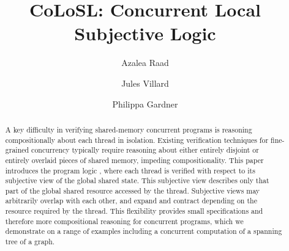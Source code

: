 \documentclass[runningheads,a4paper]{llncs}
\begin{document}
%
\title{CoLoSL: Concurrent Local Subjective Logic}
\author{Azalea Raad\and Jules Villard\and Philippa Gardner}

\maketitle

\begin{abstract}
A key difficulty in verifying shared-memory concurrent programs is
reasoning compositionally about each thread in isolation. Existing
verification techniques for fine-grained concurrency typically require
reasoning about either entirely disjoint or entirely overlaid pieces
of shared memory, impeding compositionality.  This paper introduces
the program logic \colosl, where each thread is verified with respect
to its subjective view of the global shared state.  This subjective
view describes only that part of the global shared resource accessed
by the thread. Subjective views may arbitrarily overlap with each
other, and expand and contract depending on the resource required by
the thread.  This flexibility provides small specifications and
therefore more compositional reasoning for concurrent programs, which
we demonstrate on a range of examples including a concurrent
computation of a spanning tree of a graph.
\end{abstract}

\allowdisplaybreaks







%
\end{document}
